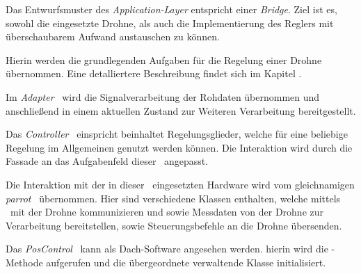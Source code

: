 Das Entwurfsmuster des \textit{Application-Layer} entspricht einer \textit{Bridge}. Ziel ist es, sowohl die eingesetzte Drohne, als auch die Implementierung des Reglers mit überschaubarem Aufwand austauschen zu können.

Hierin werden die grundlegenden Aufgaben für die Regelung einer Drohne übernommen. Eine detalliertere Beschreibung findet sich im Kapitel .


Im \textit{Adapter} \Pack\ wird die Signalverarbeitung der Rohdaten übernommen und anschließend in einem aktuellen Zustand zur Weiteren Verarbeitung bereitgestellt.


Das \textit{Controller} \Pack\ einspricht beinhaltet Regelungsglieder, welche für eine beliebige Regelung im Allgemeinen genutzt werden können. Die Interaktion wird durch die Fassade  an das Aufgabenfeld dieser \Arbeit\ angepasst.


Die Interaktion mit der in dieser \Arbeit\ eingesetzten Hardware wird vom gleichnamigen \textit{parrot} \Pack\ übernommen. Hier sind verschiedene Klassen enthalten, welche mittels \ROS\ \Topic[s] mit der Drohne kommunizieren und sowie Messdaten von der Drohne zur Verarbeitung bereitstellen, sowie Steuerungsbefehle an die Drohne übersenden.


Das \textit{PosControl} \Pack\ kann als Dach-Software angesehen werden. hierin wird die -Methode aufgerufen und die übergeordnete verwaltende Klasse initialisiert.
